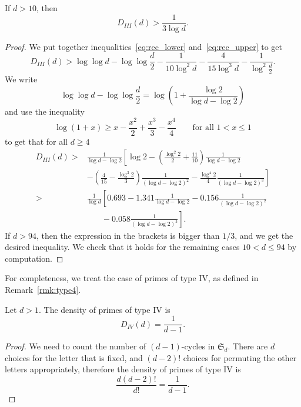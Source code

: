 \documentclass{book}
\renewcommand{\SS}{\mathfrak{S}}
\begin{document}
\begin{proposition}\label{prop:type3}
  If $d>10$, then
  \begin{equation*}
    D_{III}(d)>\frac{1}{3\log d}.
  \end{equation*}
\end{proposition}
\begin{proof}
  We put together inequalities~\eqref{eq:rec_lower} and~\eqref{eq:rec_upper}
  to get
  \begin{equation*}
    D_{III}(d)>\log\log d-\log\log\frac{d}{2}-\frac{1}{10\log^2 d}
    -\frac{4}{15\log^3 d}-\frac{1}{\log^2\frac{d}{2}}.
  \end{equation*}
  We write
  \begin{equation*}
    \log\log d - \log\log\frac{d}{2} =\log\left(1+\frac{\log 2}{\log d-\log
    2}\right)
  \end{equation*}
  and use the inequality
  \begin{equation*}
    \log(1+x)\geq x-\frac{x^2}{2}+\frac{x^3}{3}-\frac{x^4}{4}
    \qquad\text{for all }1<x\leq 1
  \end{equation*}
  to get that for all $d\geq 4$
  \begin{align*}
    D_{III}(d)>&\frac{1}{\log d-\log 2}\left[
      \log 2
      -\left(\frac{\log^2 2}{2}+\frac{11}{10}\right)\frac{1}{\log d-\log
      2}\right.\\
      &\left.%
      -\left(\frac{4}{15}-\frac{\log^3 2}{3}\right)\frac{1}{(\log d-\log 2)^2}
      -\frac{\log^4 2}{4}\frac{1}{(\log d-\log 2)^3}
      \right]\\
      >&\frac{1}{\log d}\left[
      0.693-1.341\frac{1}{\log d-\log 2}
      -0.156\frac{1}{(\log d-\log 2)^2}\right.\\
      &\left.\phantom{\frac{1}{\log d}}
      -0.058\frac{1}{(\log d-\log 2)^3}
      \right].
  \end{align*}
  If $d>94$, then the expression in the brackets is bigger than $1/3$, and we
  get the desired inequality.  We check that it holds for the remaining cases
  $10<d\leq 94$ by computation.
\end{proof}

For completeness, we treat the case of primes of type IV, as defined in
Remark~\ref{rmk:type4}.

\begin{proposition}\label{prop:type4}
  Let $d>1$.  The density of primes of type IV is
  \begin{equation*}
    D_{IV}(d)=\frac{1}{d-1}.
  \end{equation*}
\end{proposition}
\begin{proof}
  We need to count the number of $(d-1)$-cycles in $\SS_d$.  There are $d$
  choices for the letter that is fixed, and $(d-2)!$ choices for permuting the
  other letters appropriately, therefore the density of primes of type IV is
  \begin{equation*}
    \frac{d(d-2)!}{d!}=\frac{1}{d-1}.
  \end{equation*}
\end{proof}
\end{document}
